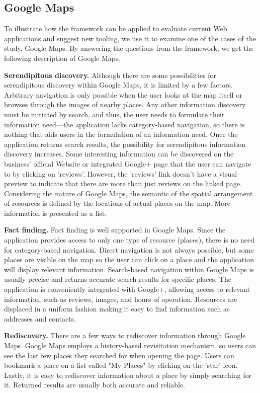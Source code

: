 {\subsection{Google Maps}
To illustrate how the framework can be applied to evaluate current Web applications and suggest new tooling, we use it to examine one of the cases of the study, Google Maps. By answering the questions from the framework, we get the following description of Google Maps.

\textbf{Serendipitous discovery.} Although there are some possibilities for serendipitous discovery within Google Maps, it is limited by a few factors. Arbitrary navigation is only possible when the user looks at the map itself or browses through the images of nearby places. Any other information discovery must be initiated by search, and thus, the user needs to formulate their information need---the application lacks category-based navigation, so there is nothing that aids users in the formulation of an information need. Once the application returns search results, the possibility for serendipitous information discovery increases. Some interesting information can be discovered on the business' official Website or integrated Google+ page that the user can navigate to by clicking on 'reviews'. However, the 'reviews' link doesn't have a visual preview to indicate that there are more than just reviews on the linked page. Considering the nature of Google Maps, the semantic of the spatial arrangement of resources is defined by the locations of actual places on the map. More information is presented as a list. 

\textbf{Fact finding.} Fact finding is well supported in Google Maps. Since the application provides access to only one type of resource (places), there is no need for category-based navigation. Direct navigation is not always possible, but some places are visible on the map so the user can click on a place and the application will display relevant information. Search-based navigation within Google Maps is usually precise and returns accurate search results for specific places. The application is conveniently integrated with Google+, allowing access to relevant information, such as reviews, images, and hours of operation. Resources are displaced in a uniform fashion making it easy to find information such as addresses and contacts. 

\textbf{Rediscovery.} There are a few ways to rediscover information through Google Maps. Google Maps employs a history-based revisitation mechanism, so users can see the last few places they searched for when opening the page. Users can bookmark a place on a list called "My Places" by clicking on the 'star' icon. Lastly, it is easy to rediscover information about a place by simply searching for it. Returned results are usually both accurate and reliable.

}
